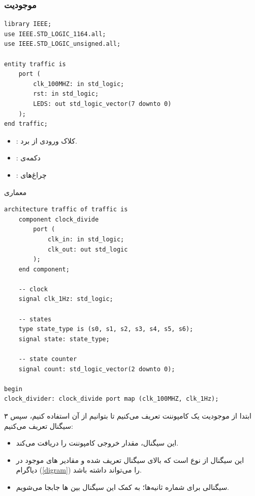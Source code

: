 \documentclass[dvipsnames, svgnames, x11names, a4paper, 11pt]{article}
\begin{document}
\subsubsection{موجودیت }
\begin{latin}
\begin{lstlisting}
library IEEE;
use IEEE.STD_LOGIC_1164.all;
use IEEE.STD_LOGIC_unsigned.all;

entity traffic is
    port (
        clk_100MHZ: in std_logic;
        rst: in std_logic;
        LEDS: out std_logic_vector(7 downto 0)
    );
end traffic;
\end{lstlisting}
\end{latin}
\begin{itemize}
\item {}:
کلاک ورودی از برد.

\item {}:
دکمه‌ی 

\item {}:
چراغ‌های 
\end{itemize}
\newpage
معماری
\begin{latin}
\begin{lstlisting}[firstnumber=12]
architecture traffic of traffic is
    component clock_divide
        port (
            clk_in: in std_logic;
            clk_out: out std_logic
        );
	end component;

    -- clock
    signal clk_1Hz: std_logic;

    -- states
    type state_type is (s0, s1, s2, s3, s4, s5, s6);
    signal state: state_type;

    -- state counter
    signal count: std_logic_vector(2 downto 0);

begin
clock_divider: clock_divide port map (clk_100MHZ, clk_1Hz);
\end{lstlisting}
\end{latin}
ابتدا
از موجودیت 
یک کامپوننت تعریف می‌کنیم تا بتوانیم از آن استفاده کنیم، سپس ۳ سیگنال تعریف می‌کنیم:
\begin{itemize}
\item {}

این سیگنال، مقدار خروجی کامپوننت 
را دریافت می‌کند.

\item {}

این سیگنال از نوع 
است که بالای سیگنال تعریف شده و مقادیر 
های
موجود در دیاگرام (\ref{digram}) را می‌تواند داشته باشد.

\item {}

سیگنالی برای شماره ثانیه‌ها؛ به کمک این سیگنال بین 
ها
جابجا می‌شویم.
\end{itemize}
\end{document}
